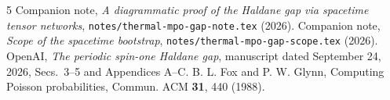 \documentclass[aps,prl,reprint,amsmath,amssymb,nofootinbib,raggedbottom]{revtex4-2}
\begin{document}
\begin{thebibliography}{5}
Companion note, \emph{A diagrammatic proof of the Haldane gap via spacetime
tensor networks}, \texttt{notes/thermal-mpo-gap-note.tex} (2026).
Companion note, \emph{Scope of the spacetime bootstrap},
\texttt{notes/thermal-mpo-gap-scope.tex} (2026).
OpenAI, \emph{The periodic spin-one Haldane gap}, manuscript dated
September 24, 2026, Secs.~3--5 and Appendices A--C.
B. L. Fox and P. W. Glynn, Computing Poisson probabilities,
Commun. ACM \textbf{31}, 440 (1988).
\end{thebibliography}
\end{document}
